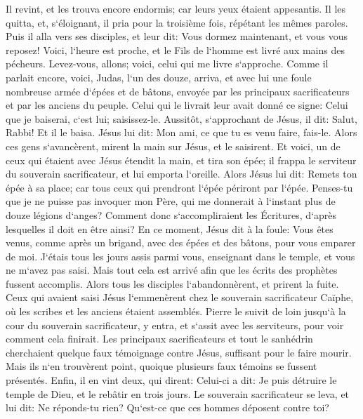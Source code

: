 \verse Il revint, et les trouva encore endormis; car leurs yeux étaient appesantis. 
\verse Il les quitta, et, s`éloignant, il pria pour la troisième fois, répétant les mêmes paroles. 
\verse Puis il alla vers ses disciples, et leur dit: Vous dormez maintenant, et vous vous reposez! Voici, l`heure est proche, et le Fils de l`homme est livré aux mains des pécheurs. 
\verse Levez-vous, allons; voici, celui qui me livre s`approche. 
\verse Comme il parlait encore, voici, Judas, l`un des douze, arriva, et avec lui une foule nombreuse armée d`épées et de bâtons, envoyée par les principaux sacrificateurs et par les anciens du peuple. 
\verse Celui qui le livrait leur avait donné ce signe: Celui que je baiserai, c`est lui; saisissez-le. 
\verse Aussitôt, s`approchant de Jésus, il dit: Salut, Rabbi! Et il le baisa. 
\verse Jésus lui dit: Mon ami, ce que tu es venu faire, fais-le. Alors ces gens s`avancèrent, mirent la main sur Jésus, et le saisirent. 
\verse Et voici, un de ceux qui étaient avec Jésus étendit la main, et tira son épée; il frappa le serviteur du souverain sacrificateur, et lui emporta l`oreille. 
\verse Alors Jésus lui dit: Remets ton épée à sa place; car tous ceux qui prendront l`épée périront par l`épée. 
\verse Penses-tu que je ne puisse pas invoquer mon Père, qui me donnerait à l`instant plus de douze légions d`anges? 
\verse Comment donc s`accompliraient les Écritures, d`après lesquelles il doit en être ainsi? 
\verse En ce moment, Jésus dit à la foule: Vous êtes venus, comme après un brigand, avec des épées et des bâtons, pour vous emparer de moi. J`étais tous les jours assis parmi vous, enseignant dans le temple, et vous ne m`avez pas saisi. 
\verse Mais tout cela est arrivé afin que les écrits des prophètes fussent accomplis. Alors tous les disciples l`abandonnèrent, et prirent la fuite. 
\verse Ceux qui avaient saisi Jésus l`emmenèrent chez le souverain sacrificateur Caïphe, où les scribes et les anciens étaient assemblés. 
\verse Pierre le suivit de loin jusqu`à la cour du souverain sacrificateur, y entra, et s`assit avec les serviteurs, pour voir comment cela finirait. 
\verse Les principaux sacrificateurs et tout le sanhédrin cherchaient quelque faux témoignage contre Jésus, suffisant pour le faire mourir. 
\verse Mais ils n`en trouvèrent point, quoique plusieurs faux témoins se fussent présentés. Enfin, il en vint deux, qui dirent: 
\verse Celui-ci a dit: Je puis détruire le temple de Dieu, et le rebâtir en trois jours. 
\verse Le souverain sacrificateur se leva, et lui dit: Ne réponds-tu rien? Qu`est-ce que ces hommes déposent contre toi? 
